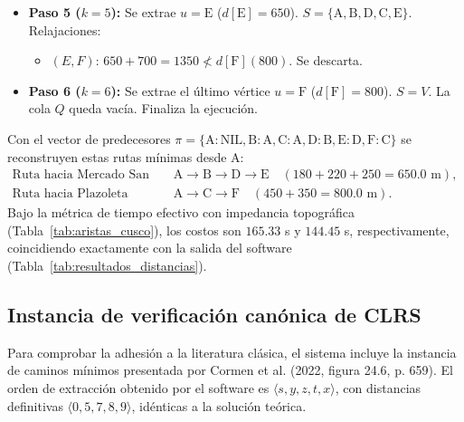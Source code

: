 \begin{itemize}
    \begin{itemize}
        \item $(C, F)$: $450 + 350 = 800 < d[\text{F}] (\infty) \implies d[\text{F}] \leftarrow 800$, $\pi[\text{F}] \leftarrow \text{C}$, \texttt{Decrease-Key}$(Q, \text{F}, 800)$.
        \item $(C, E)$: $450 + 600 = 1050 \not< d[\text{E}] (650)$. Se descarta.
    \end{itemize}
    \item \textbf{Paso 5 ($k=5$):} Se extrae $u = \text{E}$ ($d[\text{E}]=650$). $S = \{\text{A}, \text{B}, \text{D}, \text{C}, \text{E}\}$. Relajaciones:
    \begin{itemize}
        \item $(E, F)$: $650 + 700 = 1350 \not< d[\text{F}] (800)$. Se descarta.
    \end{itemize}
    \item \textbf{Paso 6 ($k=6$):} Se extrae el último vértice $u = \text{F}$ ($d[\text{F}]=800$). $S = V$. La cola $Q$ queda vacía. Finaliza la ejecución.
\end{itemize}



Con el vector de predecesores $\pi = \{\text{A}: \text{NIL}, \text{B}: \text{A}, \text{C}: \text{A}, \text{D}: \text{B}, \text{E}: \text{D}, \text{F}: \text{C}\}$ se reconstruyen estas rutas mínimas desde A:
\begin{align}
    \text{Ruta hacia Mercado San Pedro (E):} & \quad \text{A} \to \text{B} \to \text{D} \to \text{E} \quad (180 + 220 + 250 = 650.0\text{ m}), \\
    \text{Ruta hacia Plazoleta Limacpampa (F):} & \quad \text{A} \to \text{C} \to \text{F} \quad (450 + 350 = 800.0\text{ m}).
\end{align}
Bajo la métrica de tiempo efectivo con impedancia topográfica (Tabla~\ref{tab:aristas_cusco}), los costos son $165.33$ s y $144.45$ s, respectivamente, coincidiendo exactamente con la salida del software (Tabla~\ref{tab:resultados_distancias}).



\subsection{Instancia de verificación canónica de CLRS}
Para comprobar la adhesión a la literatura clásica, el sistema incluye la instancia de caminos mínimos presentada por Cormen et al. (2022, figura 24.6, p. 659). El orden de extracción obtenido por el software es $\langle s, y, z, t, x \rangle$, con distancias definitivas $\langle 0, 5, 7, 8, 9 \rangle$, idénticas a la solución teórica.

